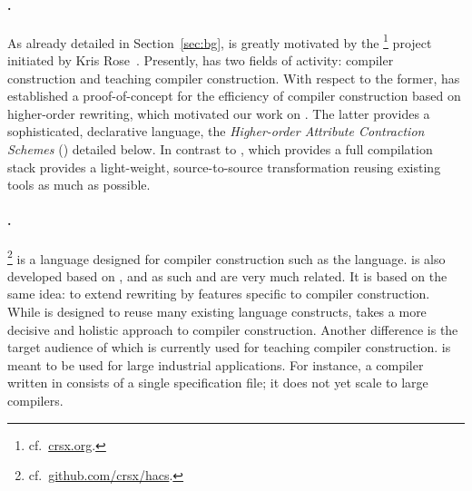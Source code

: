 %
\paragraph{\crsx.} %
%
As already detailed in Section~\ref{sec:bg}, \TransScript is greatly
motivated by the \crsx \footnote{cf.~\href{http://crsx.org/}{crsx.org}.} project initiated by Kris Rose~\cite{2010_rose,2011_rose}.
%
Presently, \crsx has two fields of activity: compiler construction 
and teaching compiler construction. %
With respect to the former, \crsx has established a proof-of-concept for
the efficiency of compiler construction based on higher-order rewriting,
which motivated our work on \TransScript. The latter provides a 
sophisticated, declarative language, the \emph{Higher-order Attribute Contraction Schemes} (\hacs) detailed below.
%
%
In contrast to \crsx, which provides a full compilation stack
\TransScript provides a light-weight, source-to-source
transformation reusing existing tools as much as possible.

\paragraph{\hacs.} %
%
\hacs \cite{gentle_hacs} \footnote{cf.~\href{https://github.com/crsx/hacs}{github.com/crsx/hacs}.} is a language designed for compiler construction such as the
\TransScript language. \hacs is also developed based on
\crsx, and as such \hacs and \TransScript are very much related. It
is based on the same idea: to extend rewriting by features specific to
compiler construction. While \TransScript is designed to reuse many existing
language constructs, \hacs takes a more decisive and holistic approach to 
compiler construction. Another difference is the target audience 
of \hacs which is currently used for teaching compiler construction.
\TransScript is meant to be used for large industrial applications.
For instance, a compiler written in \hacs consists of a single 
specification file; it does not yet scale to large compilers.
%

